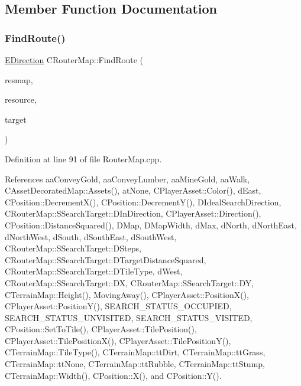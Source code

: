 \subsection{Member Function Documentation}
\hypertarget{classCRouterMap_ac638dca74d6ebe3602db9f7c69881146}{}\label{classCRouterMap_ac638dca74d6ebe3602db9f7c69881146} 
\subsubsection{\texorpdfstring{Find\+Route()}{FindRoute()}}
{\footnotesize\ttfamily \hyperlink{GameDataTypes_8h_acb2b033915f6659a71a38b5aa6e4eb42}{E\+Direction} C\+Router\+Map\+::\+Find\+Route (\begin{DoxyParamCaption}\item[{const \hyperlink{classCAssetDecoratedMap}{C\+Asset\+Decorated\+Map} \&}]{resmap,  }\item[{const \hyperlink{classCPlayerAsset}{C\+Player\+Asset} \&}]{resource,  }\item[{const \hyperlink{classCPosition}{C\+Position} \&}]{target }\end{DoxyParamCaption})}



Definition at line 91 of file Router\+Map.\+cpp.



References aa\+Convey\+Gold, aa\+Convey\+Lumber, aa\+Mine\+Gold, aa\+Walk, C\+Asset\+Decorated\+Map\+::\+Assets(), at\+None, C\+Player\+Asset\+::\+Color(), d\+East, C\+Position\+::\+Decrement\+X(), C\+Position\+::\+Decrement\+Y(), D\+Ideal\+Search\+Direction, C\+Router\+Map\+::\+S\+Search\+Target\+::\+D\+In\+Direction, C\+Player\+Asset\+::\+Direction(), C\+Position\+::\+Distance\+Squared(), D\+Map, D\+Map\+Width, d\+Max, d\+North, d\+North\+East, d\+North\+West, d\+South, d\+South\+East, d\+South\+West, C\+Router\+Map\+::\+S\+Search\+Target\+::\+D\+Steps, C\+Router\+Map\+::\+S\+Search\+Target\+::\+D\+Target\+Distance\+Squared, C\+Router\+Map\+::\+S\+Search\+Target\+::\+D\+Tile\+Type, d\+West, C\+Router\+Map\+::\+S\+Search\+Target\+::\+DX, C\+Router\+Map\+::\+S\+Search\+Target\+::\+DY, C\+Terrain\+Map\+::\+Height(), Moving\+Away(), C\+Player\+Asset\+::\+Position\+X(), C\+Player\+Asset\+::\+Position\+Y(), S\+E\+A\+R\+C\+H\+\_\+\+S\+T\+A\+T\+U\+S\+\_\+\+O\+C\+C\+U\+P\+I\+ED, S\+E\+A\+R\+C\+H\+\_\+\+S\+T\+A\+T\+U\+S\+\_\+\+U\+N\+V\+I\+S\+I\+T\+ED, S\+E\+A\+R\+C\+H\+\_\+\+S\+T\+A\+T\+U\+S\+\_\+\+V\+I\+S\+I\+T\+ED, C\+Position\+::\+Set\+To\+Tile(), C\+Player\+Asset\+::\+Tile\+Position(), C\+Player\+Asset\+::\+Tile\+Position\+X(), C\+Player\+Asset\+::\+Tile\+Position\+Y(), C\+Terrain\+Map\+::\+Tile\+Type(), C\+Terrain\+Map\+::tt\+Dirt, C\+Terrain\+Map\+::tt\+Grass, C\+Terrain\+Map\+::tt\+None, C\+Terrain\+Map\+::tt\+Rubble, C\+Terrain\+Map\+::tt\+Stump, C\+Terrain\+Map\+::\+Width(), C\+Position\+::\+X(), and C\+Position\+::\+Y().


